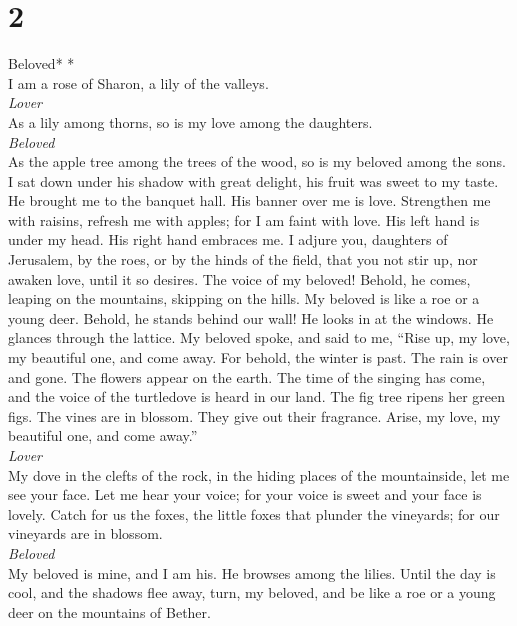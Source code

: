 \hypertarget{section-1}{%
\section{2}\label{section-1}}

\emph{\hfill\break
}Beloved* *\\

 I am a rose of Sharon, a lily of the valleys.\\
\emph{Lover}\\
 As a lily among thorns, so is my love among the
daughters.\\
\emph{Beloved}\\
 As the apple tree among the trees of the wood, so is my
beloved among the sons. I sat down under his shadow with great delight,
his fruit was sweet to my taste.  He brought me to the
banquet hall. His banner over me is love.  Strengthen me
with raisins, refresh me with apples; for I am faint with love.
 His left hand is under my head. His right hand embraces
me.  I adjure you, daughters of Jerusalem, by the roes, or
by the hinds of the field, that you not stir up, nor awaken love, until
it so desires.  The voice of my beloved! Behold, he comes,
leaping on the mountains, skipping on the hills.  My
beloved is like a roe or a young deer. Behold, he stands behind our
wall! He looks in at the windows. He glances through the lattice.
 My beloved spoke, and said to me, ``Rise up, my love, my
beautiful one, and come away.  For behold, the winter is
past. The rain is over and gone.  The flowers appear on
the earth. The time of the singing has come, and the voice of the
turtledove is heard in our land.  The fig tree ripens her
green figs. The vines are in blossom. They give out their fragrance.
Arise, my love, my beautiful one, and come away.''\\
\emph{Lover}\\
 My dove in the clefts of the rock, in the hiding places
of the mountainside, let me see your face. Let me hear your voice; for
your voice is sweet and your face is lovely.  Catch for
us the foxes, the little foxes that plunder the vineyards; for our
vineyards are in blossom.\\
\emph{Beloved}\\
 My beloved is mine, and I am his. He browses among the
lilies.  Until the day is cool, and the shadows flee
away, turn, my beloved, and be like a roe or a young deer on the
mountains of Bether.

